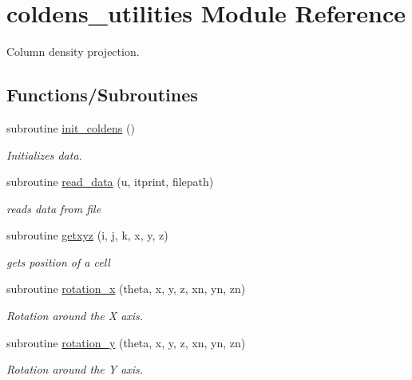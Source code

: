 \hypertarget{namespacecoldens__utilities}{}\section{coldens\+\_\+utilities Module Reference}
\label{namespacecoldens__utilities}


Column density projection.  


\subsection*{Functions/\+Subroutines}
\begin{DoxyCompactItemize}
\item 
subroutine \hyperlink{namespacecoldens__utilities_a9fa20a511c2b17a33fdb8fc1b3bf55a2}{init\+\_\+coldens} ()
\begin{DoxyCompactList}\small\item\em Initializes data. \end{DoxyCompactList}\item 
subroutine \hyperlink{namespacecoldens__utilities_a2dafe54f1edb888f313949f4f801e2d6}{read\+\_\+data} (u, itprint, filepath)
\begin{DoxyCompactList}\small\item\em reads data from file \end{DoxyCompactList}\item 
subroutine \hyperlink{namespacecoldens__utilities_a7df7ce1cf8187ca5393dc35effa22020}{getxyz} (i, j, k, x, y, z)
\begin{DoxyCompactList}\small\item\em gets position of a cell \end{DoxyCompactList}\item 
subroutine \hyperlink{namespacecoldens__utilities_af7f94bfb5ffee491708d3f221915abcf}{rotation\+\_\+x} (theta, x, y, z, xn, yn, zn)
\begin{DoxyCompactList}\small\item\em Rotation around the X axis. \end{DoxyCompactList}\item 
subroutine \hyperlink{namespacecoldens__utilities_a989fb82adc69b6b1c00a2d2400c9854a}{rotation\+\_\+y} (theta, x, y, z, xn, yn, zn)
\begin{DoxyCompactList}\small\item\em Rotation around the Y axis. \end{DoxyCompactList}\item 

\end{DoxyCompactItemize}
